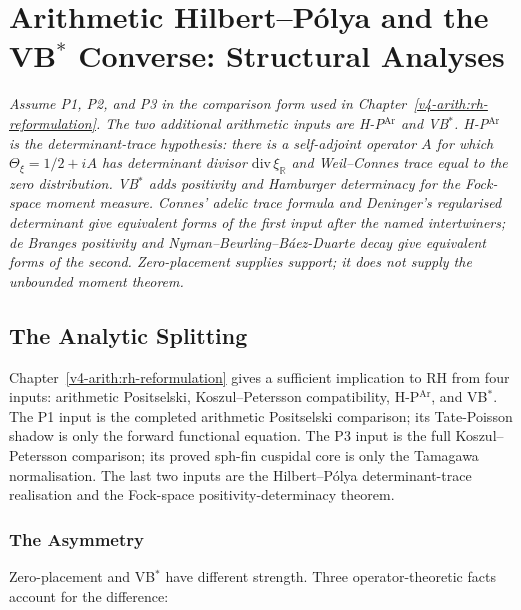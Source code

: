 \chapter[Arithmetic Hilbert--P\'olya and VB\(^{*}\)]{Arithmetic Hilbert--P\'olya and the VB\(^{*}\) Converse: Structural Analyses}
\label{v4-arith:HPAr-vbconverse}

\emph{Assume P1, P2, and P3 in the comparison form used in
Chapter~\ref{v4-arith:rh-reformulation}.  The two additional arithmetic
inputs are H-P\(^{\mathrm{Ar}}\) and VB\(^{*}\).  H-P\(^{\mathrm{Ar}}\)
is the determinant-trace hypothesis: there is a self-adjoint operator
\(A\) for which
\(\Theta_{\xi}=1/2+iA\) has determinant divisor
\(\mathrm{div}\,\xi_{\mathbb R}\) and Weil--Connes trace equal to the
zero distribution.  VB\(^{*}\) adds positivity and Hamburger
determinacy for the Fock-space moment measure.  Connes' adelic trace
formula and Deninger's regularised determinant give equivalent forms of
the first input after the named intertwiners; de Branges positivity and
Nyman--Beurling--B\'aez-Duarte decay give equivalent forms of the
second.  Zero-placement supplies support; it does not supply the
unbounded moment theorem.}

\section{The Analytic Splitting}
\label{v4-arith:hpvbconv:context}

Chapter~\ref{v4-arith:rh-reformulation} gives a sufficient implication
to RH from four inputs: arithmetic Positselski, Koszul--Petersson
compatibility, H-P\(^{\mathrm{Ar}}\), and VB\(^{*}\).  The P1 input is
the completed arithmetic Positselski comparison; its Tate-Poisson
shadow is only the forward functional equation.  The P3 input is the
full Koszul--Petersson comparison; its proved sph-fin cuspidal core is
only the Tamagawa normalisation.  The last two inputs are the
Hilbert--P\'olya determinant-trace realisation and the Fock-space
positivity-determinacy theorem.

\subsection{The Asymmetry}
\label{v4-arith:hpvbconv:gap-structure}

Zero-placement and VB\(^{*}\) have different strength. Three
operator-theoretic facts account for the difference:

